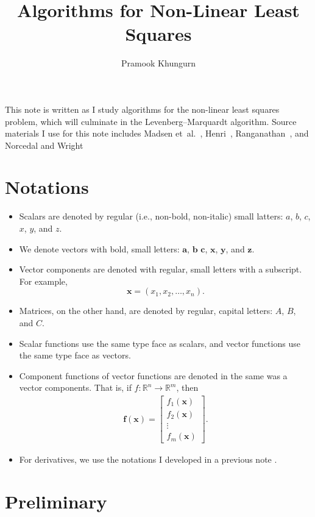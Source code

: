 \documentclass[10pt]{article}
\title{Algorithms for Non-Linear Least Squares}
\author{Pramook Khungurn}
\newcommand{\ve}[1]{\mathbf{#1}}
\newcommand{\etal}{{et~al.}}
\newcommand{\ra}{\rightarrow}
\newcommand{\Real}{\mathbb{R}}
\begin{document}
\maketitle

This note is written as I study algorithms for the non-linear least squares problem, which will culminate in the Levenberg--Marquardt algorithm. Source materials I use for this note includes Madsen \etal~\cite{Madsen:2004}, Henri~\cite{Henri:2024}, Ranganathan~\cite{Ranganathan:2004}, and Norcedal and Wright~\cite{Norcedal:2006}

\section{Notations}

\begin{itemize}
    \item Scalars are denoted by regular (i.e., non-bold, non-italic) small latters: $a$, $b$, $c$, $x$, $y$, and $z$.
    \item We denote vectors with bold, small letters: $\ve{a}$, $\ve{b}$ $\ve{c}$, $\ve{x}$, $\ve{y}$, and $\ve{z}$.
    \item Vector components are denoted with regular, small letters with a subscript. For example, $$\ve{x} = (x_1, x_2, \dots, x_n).$$
    \item Matrices, on the other hand, are denoted by regular, capital letters: $A$, $B$, and $C$.
    \item Scalar functions use the same type face as scalars, and vector functions use the same type face as vectors.
    \item Component functions of vector functions are denoted in the same was a vector components. That is, if $f: \Real^n \ra \Real^m$, then
    \begin{align*}
        \ve{f}(\ve{x}) = \begin{bmatrix} f_1(\ve{x}) \\ f_2(\ve{x}) \\ \vdots \\ f_m(\ve{x}) \end{bmatrix}.
    \end{align*}
    \item For derivatives, we use the notations I developed in a previous note \cite{Khungurn:2022}.
\end{itemize}

\section{Preliminary}
\end{document}
